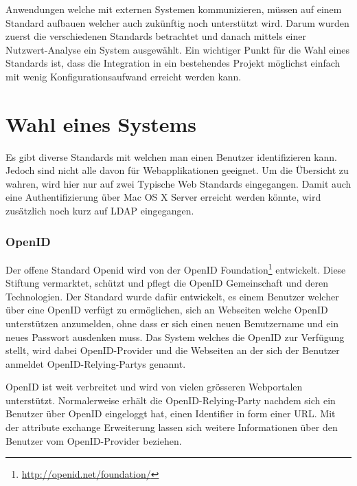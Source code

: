 Anwendungen welche mit externen Systemen kommunizieren, müssen auf einem Standard aufbauen welcher auch zukünftig noch unterstützt wird. Darum wurden zuerst die verschiedenen Standards betrachtet und danach mittels einer Nutzwert-Analyse ein System ausgewählt. Ein wichtiger Punkt für die Wahl eines Standards ist, dass die Integration in ein bestehendes Projekt möglichst einfach mit wenig Konfigurationsaufwand erreicht werden kann.

\section{Wahl eines Systems}
\label{sec:Wahl eines Systems}
Es gibt diverse Standards mit welchen man einen Benutzer identifizieren kann. Jedoch sind nicht alle davon für Webapplikationen geeignet. Um die Übersicht zu wahren, wird hier nur auf zwei Typische Web Standards eingegangen. Damit auch eine Authentifizierung über Mac OS X Server erreicht werden könnte, wird zusätzlich noch kurz auf LDAP eingegangen.

\subsubsection{OpenID}
\label{ssub:OpenID}
Der offene Standard Openid wird von der OpenID
Foundation\footnote{\url{http://openid.net/foundation/}} entwickelt. Diese Stiftung vermarktet, schützt und pflegt die OpenID Gemeinschaft und deren Technologien. Der Standard wurde dafür entwickelt, es einem Benutzer welcher über eine OpenID verfügt zu ermöglichen, sich an Webseiten welche OpenID unterstützen anzumelden, ohne dass er sich einen neuen Benutzername und ein neues Passwort ausdenken muss. Das System welches die OpenID zur Verfügung stellt, wird dabei \gls{OpenID-Provider} und die Webseiten an der sich der Benutzer anmeldet \glspl{OpenID-Relying-Party} genannt.

OpenID ist weit verbreitet und wird von vielen grösseren Webportalen unterstützt. Normalerweise erhält die \gls{OpenID-Relying-Party} nachdem sich ein Benutzer über OpenID eingeloggt hat, einen Identifier in form einer URL. Mit der attribute exchange Erweiterung lassen sich weitere Informationen über den Benutzer vom \gls{OpenID-Provider} beziehen.


